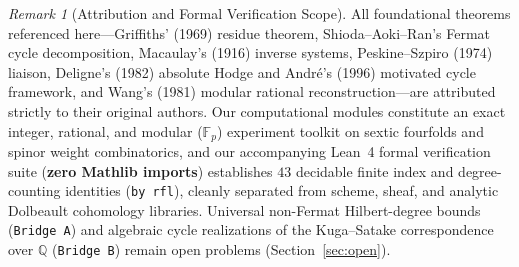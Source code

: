 \documentclass[11pt,a4paper]{amsart}
\theoremstyle{definition}
\theoremstyle{remark}
\newtheorem{remark}[theorem]{Remark}
\begin{document}
\begin{remark}[Attribution and Formal Verification Scope]
All foundational theorems referenced here---Griffiths' (1969) residue theorem, Shioda--Aoki--Ran's Fermat cycle decomposition, Macaulay's (1916) inverse systems, Peskine--Szpiro (1974) liaison, Deligne's (1982) absolute Hodge and Andr\'e's (1996) motivated cycle framework, and Wang's (1981) modular rational reconstruction---are attributed strictly to their original authors. Our computational modules constitute an exact integer, rational, and modular ($\mathbb{F}_p$) experiment toolkit on sextic fourfolds and spinor weight combinatorics, and our accompanying Lean~4 formal verification suite (\textbf{zero Mathlib imports}) establishes $43$ decidable finite index and degree-counting identities (\texttt{by rfl}), cleanly separated from scheme, sheaf, and analytic Dolbeault cohomology libraries. Universal non-Fermat Hilbert-degree bounds (\texttt{Bridge~A}) and algebraic cycle realizations of the Kuga--Satake correspondence over $\mathbb{Q}$ (\texttt{Bridge~B}) remain open problems (Section~\ref{sec:open}).
\end{remark}
\end{document}
